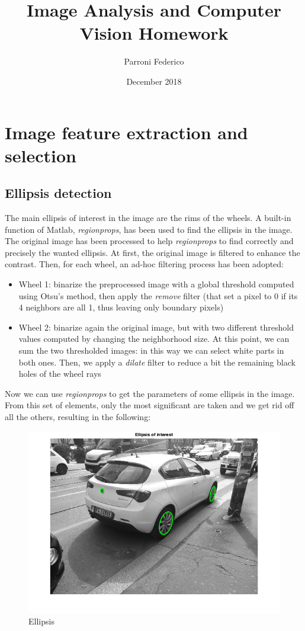 \documentclass{article}
\title{Image Analysis and Computer Vision Homework}
\author{Parroni Federico}
\date{December 2018}
\begin{document}
\maketitle

\section{Image feature extraction and selection}

\subsection{Ellipsis detection}
The main ellipsis of interest in the image are the rims of the wheels. A built-in function of Matlab, \textit{regionprops}, has been used to find the ellipsis in the image.
The original image has been processed to help \textit{regionprops} to find correctly and precisely the wanted ellipsis.
At first, the original image is filtered to enhance the contrast. Then, for each wheel, an ad-hoc filtering process has been adopted:
\begin{itemize}
    \item Wheel 1: binarize the preprocessed image with a global threshold computed using Otsu's method, then apply the \textit{remove} filter (that set a pixel to 0 if its 4 neighbors are all 1, thus leaving only boundary pixels)
    \item Wheel 2: binarize again the original image, but with two different threshold values computed by changing the neighborhood size. At this point, we can sum the two thresholded images: in this way we can select white parts in both ones. Then, we apply a \textit{dilate} filter to reduce a bit the remaining black holes of the wheel rays
\end{itemize}
Now we can use \textit{regionprops} to get the parameters of some ellipsis in the image. From this set of elements, only the most significant are taken and we get rid off all the others, resulting in the following:
\begin{figure}[h!]
\centering
\includegraphics[scale=0.6]{images/homework_08.png}
\caption{Ellipsis}
\label{fig:ellipsis}
\end{figure}
\end{document}
